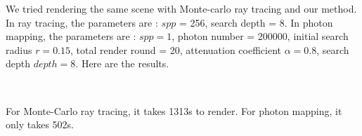 \documentclass[acmtog]{acmart}
\begin{document}
	We tried rendering the same scene with Monte-carlo ray tracing and our method. In ray tracing, the parameters are : $spp$ = 256,
	search depth = 8. In photon mapping, the parameters are : $spp = 1$, photon number = 200000, initial search radius $r = 0.15$, total render round = 20, attenuation coefficient $\alpha = 0.8$,
	search depth $depth = 8$. Here are the results.
	\begin{figure}[H]
		\centering
		
		 \
	\end{figure}
	For Monte-Carlo ray tracing, it takes 1313s to render. For photon mapping, it only takes 502s. 
\end{document}
